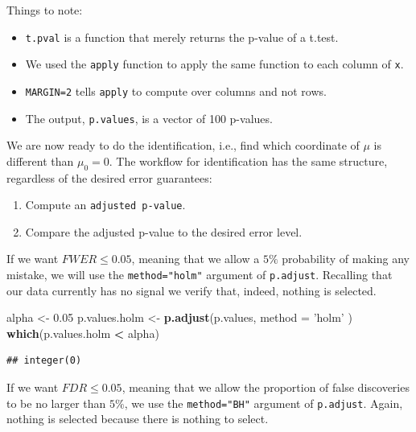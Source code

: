\documentclass[]{book}
\newenvironment{Shaded}{\begin{snugshade}}{\end{snugshade}}
\newcommand{\DataTypeTok}[1]{\textcolor[rgb]{0.13,0.29,0.53}{#1}}
\newcommand{\FloatTok}[1]{\textcolor[rgb]{0.00,0.00,0.81}{#1}}
\newcommand{\KeywordTok}[1]{\textcolor[rgb]{0.13,0.29,0.53}{\textbf{#1}}}
\newcommand{\NormalTok}[1]{#1}
\newcommand{\OperatorTok}[1]{\textcolor[rgb]{0.81,0.36,0.00}{\textbf{#1}}}
\newcommand{\StringTok}[1]{\textcolor[rgb]{0.31,0.60,0.02}{#1}}
\providecommand{\tightlist}{%
  \setlength{\itemsep}{0pt}\setlength{\parskip}{0pt}}
\theoremstyle{definition}
\theoremstyle{definition}
\theoremstyle{definition}
\theoremstyle{remark}
\begin{document}
Things to note:

\begin{itemize}
\tightlist
\item
  \texttt{t.pval} is a function that merely returns the p-value of a t.test.
\item
  We used the \texttt{apply} function to apply the same function to each column of \texttt{x}.
\item
  \texttt{MARGIN=2} tells \texttt{apply} to compute over columns and not rows.
\item
  The output, \texttt{p.values}, is a vector of 100 p-values.
\end{itemize}

We are now ready to do the identification, i.e., find which coordinate of \(\mu\) is different than \(\mu_0=0\).
The workflow for identification has the same structure, regardless of the desired error guarantees:

\begin{enumerate}
\def\labelenumi{\arabic{enumi}.}
\tightlist
\item
  Compute an \texttt{adjusted\ p-value}.
\item
  Compare the adjusted p-value to the desired error level.
\end{enumerate}

If we want \(FWER \leq 0.05\), meaning that we allow a \(5\%\) probability of making any mistake, we will use the \texttt{method="holm"} argument of \texttt{p.adjust}.
Recalling that our data currently has no signal we verify that, indeed, nothing is selected.

\begin{Shaded}
\begin{Highlighting}[]
\NormalTok{alpha <-}\StringTok{ }\FloatTok{0.05}
\NormalTok{p.values.holm <-}\StringTok{ }\KeywordTok{p.adjust}\NormalTok{(p.values, }\DataTypeTok{method =} \StringTok{'holm'}\NormalTok{ )}
\KeywordTok{which}\NormalTok{(p.values.holm }\OperatorTok{<}\StringTok{ }\NormalTok{alpha)}
\end{Highlighting}
\end{Shaded}

\begin{verbatim}
## integer(0)
\end{verbatim}

If we want \(FDR \leq 0.05\), meaning that we allow the proportion of false discoveries to be no larger than \(5\%\), we use the \texttt{method="BH"} argument of \texttt{p.adjust}.
Again, nothing is selected because there is nothing to select.
\end{document}
